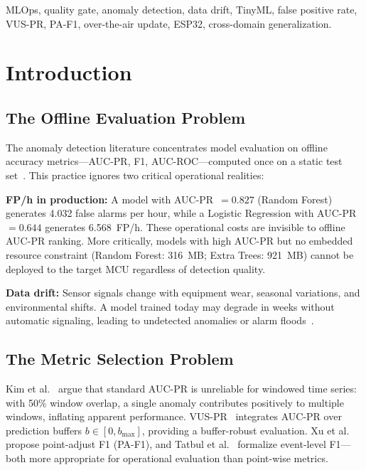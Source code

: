 \documentclass[conference]{IEEEtran}
\begin{document}
\begin{IEEEkeywords}
MLOps, quality gate, anomaly detection, data drift, TinyML, false positive
rate, VUS-PR, PA-F1, over-the-air update, ESP32, cross-domain generalization.
\end{IEEEkeywords}

\section{Introduction}
\label{sec:intro}

\subsection{The Offline Evaluation Problem}

The anomaly detection literature concentrates model evaluation on offline
accuracy metrics---AUC-PR, F1, AUC-ROC---computed once on a static test
set~\cite{pang2021deep}.
This practice ignores two critical operational realities:

\textbf{FP/h in production:}
A model with AUC-PR~$=0.827$ (Random Forest) generates 4.032 false alarms per
hour, while a Logistic Regression with AUC-PR~$=0.644$ generates 6.568~FP/h.
These operational costs are invisible to offline AUC-PR ranking.
More critically, models with high AUC-PR but no embedded resource constraint
(Random Forest: 316~MB; Extra Trees: 921~MB) cannot be deployed to the target
MCU regardless of detection quality.

\textbf{Data drift:}
Sensor signals change with equipment wear, seasonal variations, and
environmental shifts.
A model trained today may degrade in weeks without automatic signaling,
leading to undetected anomalies or alarm floods~\cite{gama2014survey}.

\subsection{The Metric Selection Problem}

Kim et al.~\cite{kim2022towards} argue that standard AUC-PR is unreliable
for windowed time series: with 50\% window overlap, a single anomaly
contributes positively to multiple windows, inflating apparent performance.
VUS-PR~\cite{kim2022towards} integrates AUC-PR over prediction buffers
$b \in [0, b_{\max}]$, providing a buffer-robust evaluation.
Xu et al.~\cite{xu2018donut} propose point-adjust F1 (PA-F1), and
Tatbul et al.~\cite{tatbul2018precision} formalize event-level F1---both
more appropriate for operational evaluation than point-wise metrics.
\end{document}
